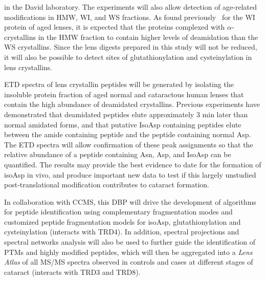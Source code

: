 \documentclass[arial,11pt]{article}
\begin{document}
 in the David laboratory. The experiments will also allow detection of age-related modifications in HMW, WI, and WS fractions.  As found previously~\cite{Wilmarth06} for the WI protein of aged lenses, it is expected that the proteins complexed with $\alpha$-crystallins in the HMW fraction to contain higher levels of deamidation than the WS crystallins.  Since the lens digests prepared in this study will not be reduced, it will also be possible to detect sites of glutathionylation and cysteinylation in lens crystallins.  %

ETD spectra of lens crystallin peptides will be generated by isolating the insoluble protein fraction of aged normal and cataractous human lenses that contain the high abundance of deamidated crystallins.
Previous experiments have demonstrated that deamidated peptides elute approximately 3 min later than normal amidated forms, and that putative IsoAsp containing peptides elute between the amide containing peptide and the peptide containing normal Asp.  The ETD spectra will allow confirmation of these peak assignments so that the relative abundance of a peptide containing Asn, Asp, and IsoAsp can be quantified.  The results may provide the best evidence to date for the formation of isoAsp in vivo, and produce important new data to test if this largely unstudied post-translational modification contributes to cataract formation.  %

In collaboration with CCMS, this DBP will drive the development of algorithms for peptide identification using complementary fragmentation modes and customized peptide fragmentation models for isoAsp, glutathionylation and cysteinylation (interacts with TRD4). In addition, spectral projections and spectral networks analysis will also be used to further guide the identification of PTMs and highly modified peptides, which will then be aggregated into a {\em Lens Atlas} of all MS/MS spectra observed in controls and cases at different stages of cataract (interacts with TRD3 and TRD8).
\end{document}
